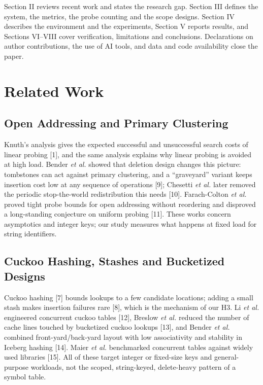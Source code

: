 \documentclass{ieeeaccess}
\begin{document}
Section II reviews recent work and states the research gap. Section III defines the system, the metrics, the probe counting and the scope designs. Section IV describes the environment and the experiments, Section V reports results, and Sections VI--VIII cover verification, limitations and conclusions. Declarations on author contributions, the use of AI tools, and data and code availability close the paper.

\section{Related Work}

\subsection{Open Addressing and Primary Clustering}

Knuth's analysis gives the expected successful and unsuccessful search costs of linear probing [1], and the same analysis explains why linear probing is avoided at high load. Bender \emph{et al.} showed that deletion design changes this picture: tombstones can act against primary clustering, and a ``graveyard'' variant keeps insertion cost low at any sequence of operations [9]; Chesetti \emph{et al.} later removed the periodic stop-the-world redistribution this needs [10]. Farach-Colton \emph{et al.} proved tight probe bounds for open addressing without reordering and disproved a long-standing conjecture on uniform probing [11]. These works concern asymptotics and integer keys; our study measures what happens at fixed load for string identifiers.

\subsection{Cuckoo Hashing, Stashes and Bucketized Designs}

Cuckoo hashing [7] bounds lookups to a few candidate locations; adding a small stash makes insertion failures rare [8], which is the mechanism of our H3. Li \emph{et al.} engineered concurrent cuckoo tables [12], Breslow \emph{et al.} reduced the number of cache lines touched by bucketized cuckoo lookups [13], and Bender \emph{et al.} combined front-yard/back-yard layout with low associativity and stability in Iceberg hashing [14]. Maier \emph{et al.} benchmarked concurrent tables against widely used libraries [15]. All of these target integer or fixed-size keys and general-purpose workloads, not the scoped, string-keyed, delete-heavy pattern of a symbol table.
\end{document}
